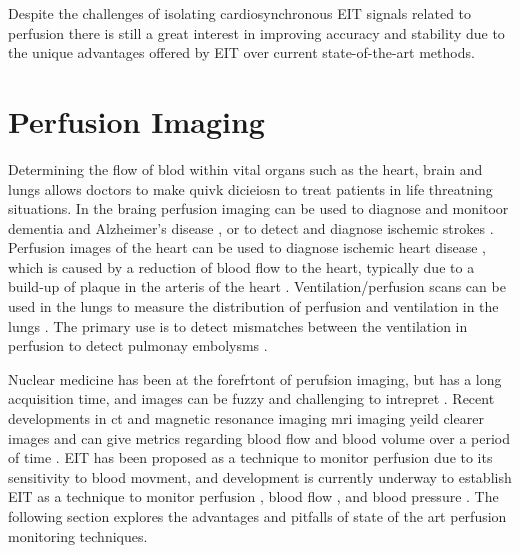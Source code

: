 Despite the challenges of isolating cardiosynchronous EIT signals related to 
perfusion there is still a great interest in 
improving accuracy and stability due to the unique 
advantages offered by EIT over current state-of-the-art methods.

\section{Perfusion Imaging}

Determining the flow of blod within vital organs such as the heart, brain and lungs 
allows doctors to make quivk dicieiosn to treat patients in life threatning situations.
In the braing perfusion imaging can be used to diagnose and monitoor dementia
and Alzheimer's disease \parencite{dougall_systematic_2004,barker_pathophysiology_2014},
or to detect and diagnose ischemic strokes 
\parencite{koenig_perfusion_1998,konstas_theoretic_2009}. 
Perfusion images of the heart can be used to diagnose ischemic 
heart disease \parencite{prvulovich_role_1998}, which is caused by a reduction 
of blood flow to the heart, typically due to 
a build-up of plaque in the arteris of the heart
\parencite{mendis_global_2011}. Ventilation/perfusion scans can be used in the 
lungs to measure the distribution of perfusion and ventilation in the lungs 
\parencite{mortensen_lung_2019}. The primary use 
is to detect mismatches between the ventilation in perfusion to detect pulmonay 
embolysms \parencite{pioped-investigators_value_1990}.   

Nuclear medicine has been at the forefrtont of perufsion imaging, but has a long
acquisition time, and images can be fuzzy and challenging to intrepret \parencite{prvulovich_role_1998}. 
Recent developments in \acrfull{ct} and magnetic resonance imaging \acrshort{mri} 
imaging yeild clearer images and can give metrics 
regarding blood flow and blood volume over a period of 
time \parencite{prvulovich_role_1998}. 
EIT has been proposed as a technique to monitor perfusion due 
to its sensitivity to blood movment, 
and development is currently underway to 
establish EIT as a technique to monitor 
perfusion \parencite{nguyen_review_2012,nguyen_perfusion_2015}, 
blood flow \parencite{braun_limitations_2018,braun_accuracy_2018}, and 
blood pressure \parencite{proenca_noninvasive_2017,proenca_non-invasive_2020}. 
The following section 
explores the advantages and pitfalls of state of the art perfusion monitoring techniques. 


